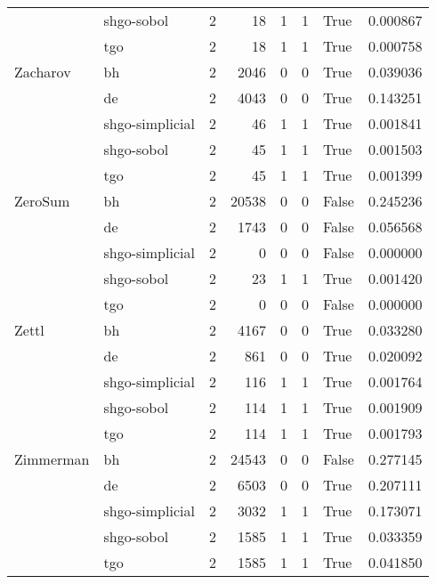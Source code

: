 \begin{longtable}{llrrrrlr}
         & shgo-sobol &     2 &       18 &      1 &       1 &    True &    0.000867 \\
         & tgo &     2 &       18 &      1 &       1 &    True &    0.000758 \\
Zacharov & bh &     2 &     2046 &      0 &       0 &    True &    0.039036 \\
         & de &     2 &     4043 &      0 &       0 &    True &    0.143251 \\
         & shgo-simplicial &     2 &       46 &      1 &       1 &    True &    0.001841 \\
         & shgo-sobol &     2 &       45 &      1 &       1 &    True &    0.001503 \\
         & tgo &     2 &       45 &      1 &       1 &    True &    0.001399 \\
ZeroSum & bh &     2 &    20538 &      0 &       0 &   False &    0.245236 \\
         & de &     2 &     1743 &      0 &       0 &   False &    0.056568 \\
         & shgo-simplicial &     2 &        0 &      0 &       0 &   False &    0.000000 \\
         & shgo-sobol &     2 &       23 &      1 &       1 &    True &    0.001420 \\
         & tgo &     2 &        0 &      0 &       0 &   False &    0.000000 \\
Zettl & bh &     2 &     4167 &      0 &       0 &    True &    0.033280 \\
         & de &     2 &      861 &      0 &       0 &    True &    0.020092 \\
         & shgo-simplicial &     2 &      116 &      1 &       1 &    True &    0.001764 \\
         & shgo-sobol &     2 &      114 &      1 &       1 &    True &    0.001909 \\
         & tgo &     2 &      114 &      1 &       1 &    True &    0.001793 \\
Zimmerman & bh &     2 &    24543 &      0 &       0 &   False &    0.277145 \\
         & de &     2 &     6503 &      0 &       0 &    True &    0.207111 \\
         & shgo-simplicial &     2 &     3032 &      1 &       1 &    True &    0.173071 \\
         & shgo-sobol &     2 &     1585 &      1 &       1 &    True &    0.033359 \\
         & tgo &     2 &     1585 &      1 &       1 &    True &    0.041850 \\

\end{longtable}
